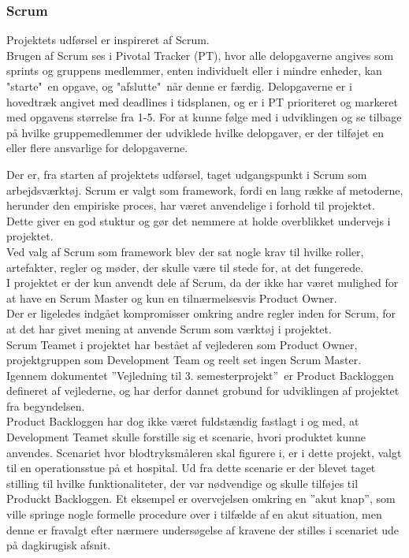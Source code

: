 \subsubsection{Scrum}
Projektets udførsel er inspireret af Scrum.\\
Brugen af Scrum ses i Pivotal Tracker (PT), hvor alle delopgaverne angives som sprints og gruppens medlemmer, enten individuelt eller i mindre enheder, kan "starte"\ en opgave, og "afslutte"\ når denne er færdig. Delopgaverne er i hovedtræk angivet med deadlines i tidsplanen, og er i PT prioriteret og markeret med opgavens størrelse fra 1-5. For at kunne følge med i udviklingen og se tilbage på hvilke gruppemedlemmer der udviklede hvilke delopgaver, er der tilføjet en eller flere ansvarlige for delopgaverne. 

Der er, fra starten af projektets udførsel, taget udgangspunkt i Scrum som arbejdsværktøj. 
Scrum er valgt som framework, fordi en lang række af metoderne, herunder den empiriske proces, har været anvendelige i forhold til projektet. Dette giver en god stuktur og gør det nemmere at holde overblikket undervejs i projektet.\\
Ved valg af Scrum som framework blev der sat nogle krav til hvilke roller, artefakter, regler og møder, der skulle være til stede for, at det fungerede. \\
I projektet er der kun anvendt dele af Scrum, da der ikke har været mulighed for at have en Scrum Master og kun en tilnærmelsesvis Product Owner.\\
Der er ligeledes indgået kompromisser omkring andre regler inden for Scrum, for at det har givet mening at anvende Scrum som værktøj i projektet.\\
\newline
Scrum Teamet i projektet har bestået af vejlederen som Product Owner, projektgruppen som Development Team og reelt set ingen Scrum Master. \\
Igennem dokumentet ”Vejledning til 3. semesterprojekt”\ er Product Backloggen defineret af vejlederne, og har derfor dannet grobund for udviklingen af projektet fra begyndelsen.\\ 
Product Backloggen har dog ikke været fuldstændig fastlagt i og med, at Development Teamet skulle forstille sig et scenarie, hvori produktet kunne anvendes. Scenariet hvor blodtryksmåleren skal figurere i, er i dette projekt, valgt til en operationsstue på et hospital. Ud fra dette scenarie er der blevet taget stilling til hvilke funktionaliteter, der var nødvendige og skulle tilføjes til Produckt Backloggen. Et eksempel er overvejelsen omkring en ”akut knap”, som ville springe nogle formelle procedure over i tilfælde af en akut situation, men denne er fravalgt efter nærmere undersøgelse af kravene der stilles i scenariet ude på dagkirugisk afsnit.\\
